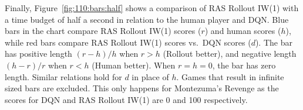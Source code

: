 \documentclass[letterpaper]{article}
\newcommand{\Omit}[1]{}
\newcommand{\CHECK}[1]{\textcolor{red}{\bf *** #1 ***}}
\begin{document}
Finally, Figure~\ref{fig:110:bars:half} shows a comparison of RAS Rollout IW(1)
with a time budget of half a second in relation to the human player and DQN.
Blue bars in the chart compare RAS Rollout IW(1) scores ($r$) and human scores
($h$), while red bars compare RAS Rollout IW(1) scores vs.\ DQN scores ($d$).
The bar has positive length $(r-h)/h$ when $r>h$ (Rollout better), and negative
length $(h-r)/r$ when $r<h$ (Human better).  When $r=h=0$, the bar has zero length.
Similar relations hold for $d$ in place of $h$.
Games that result in infinite sized bars are excluded. This only happens for
Montezuma's Revenge as the scores for DQN and RAS Rollout IW(1) are
0 and 100 respectively.

%    
\end{document}
